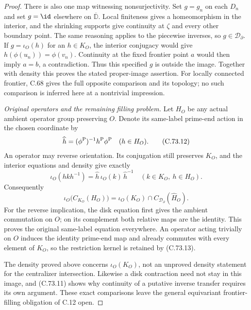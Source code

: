 \begin{proof}
There is also one map witnessing nonsurjectivity.
Set $g=g_n$ on each $D_n$ and set $g=\id$
elsewhere on $\overline{\mathbb D}$.
Local finiteness gives a homeomorphism in the
interior, and the shrinking supports give
continuity at $\zeta$ and every other boundary
point. The same reasoning applies to the
piecewise inverses, so $g\in\mathcal D_\partial$.
If $g=\iota_O(h)$ for an $h\in K_O$, the
interior conjugacy would give
$h(\phi(u_n))=\phi(v_n)$.
Continuity at the fixed frontier point $a$
would then imply $a=b$, a contradiction.
Thus this specified $g$ is outside the image.
Together with density this proves the stated
proper-image assertion. For locally connected
frontier, C.68 gives the full opposite
comparison and its topology; no such
comparison is inferred here at a nontrivial
impression.

\emph{Original operators and the remaining filling problem.}
Let $H_O$ be any actual ambient operator group
preserving $O$. Denote its same-label
prime-end action in the chosen coordinate by
\[
       \widehat h=(\phi^{\rm P})^{-1}
                           h^{\rm P}\phi^{\rm P}
               \quad(h\in H_O).
                                                               \tag{C.73.12}
\]
An operator may reverse orientation. Its
conjugation still preserves $K_O$, and the
interior equations and density give exactly
\[
       \iota_O(hkh^{-1})
           =\widehat h\,\iota_O(k)\,\widehat h^{-1}
                       \quad(k\in K_O,\ h\in H_O).
                                                               \tag{C.73.13}
\]
Consequently
\[
 \iota_O\bigl(C_{K_O}(H_O)\bigr)
       =\iota_O(K_O)\cap
                 C_{\mathcal D_\partial}(\widehat H_O).
                                                               \tag{C.73.14}
\]
For the reverse implication, the disk equation
first gives the ambient commutation on $O$;
on its complement both relative maps are
the identity. This proves the original
same-label equation everywhere. An operator
acting trivially on $O$ induces the identity
prime-end map and already commutes with every
element of $K_O$, so the restriction kernel
is retained by (C.73.13).

The density proved above concerns
$\iota_O(K_O)$, not an unproved density
statement for the centralizer intersection.
Likewise a disk contraction need not stay
in this image, and (C.73.11) shows why
continuity of a putative inverse transfer
requires its own argument. These exact
comparisons leave the general equivariant
frontier-filling obligation of C.12 open.
\end{proof}
